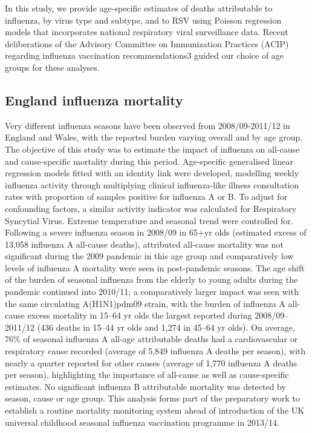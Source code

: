 In this study, we provide age-specific estimates of deaths attributable to
influenza, by virus type and subtype, and to RSV using Poisson regression
models that incorporates national respiratory viral surveillance data. Recent
deliberations of the Advisory Committee on Immunization Practices (ACIP)
regarding influenza vaccination recommendations3 guided our choice of age
groups for these analyses.

\subsection{England influenza mortality}
\cite{greenMortalityAttributableInfluenza2013}
Very different influenza seasons have been observed from 2008/09-2011/12 in
England and Wales, with the reported burden varying overall and by age group.
The objective of this study was to estimate the impact of influenza on
all-cause and cause-specific mortality during this period. Age-specific
generalised linear regression models fitted with an identity link were
developed, modelling weekly influenza activity through multiplying clinical
influenza-like illness consultation rates with proportion of samples positive
for influenza A or B. To adjust for confounding factors, a similar activity
indicator was calculated for Respiratory Syncytial Virus. Extreme temperature
and seasonal trend were controlled for. Following a severe influenza season in
2008/09 in 65+yr olds (estimated excess of 13,058 influenza A all-cause
deaths), attributed all-cause mortality was not significant during the 2009
pandemic in this age group and comparatively low levels of influenza A
mortality were seen in post-pandemic seasons. The age shift of the burden of
seasonal influenza from the elderly to young adults during the pandemic
continued into 2010/11; a comparatively larger impact was seen with the same
circulating A(H1N1)pdm09 strain, with the burden of influenza A all-cause
excess mortality in 15–64 yr olds the largest reported during 2008/09–2011/12
(436 deaths in 15–44 yr olds and 1,274 in 45–64 yr olds). On average, 76\% of
seasonal influenza A all-age attributable deaths had a cardiovascular or
respiratory cause recorded (average of 5,849 influenza A deaths per season),
with nearly a quarter reported for other causes (average of 1,770 influenza A
deaths per season), highlighting the importance of all-cause as well as
cause-specific estimates. No significant influenza B attributable mortality was
detected by season, cause or age group. This analysis forms part of the
preparatory work to establish a routine mortality monitoring system ahead of
introduction of the UK universal childhood seasonal influenza vaccination
programme in 2013/14.

